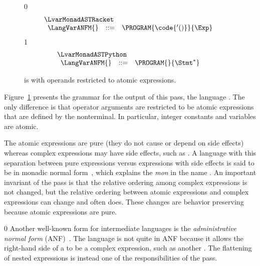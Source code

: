 \documentclass[7x10]{TimesAPriori_MIT}%
\def\racketEd{0}
\def\pythonEd{1}
\def\edition{1}
\newcommand{\pythonColor}[0]{}
\numberwithin{theorem}{chapter}
\numberwithin{definition}{chapter}
\numberwithin{equation}{chapter}
\begin{document}
\begin{figure}[tp]
\centering
\begin{tcolorbox}[colback=white]
{\if\edition\racketEd
\[
\begin{array}{l}
  \LvarMonadASTRacket \\
\begin{array}{rcl}
\LangVarANFM{}  &::=& \PROGRAM{\code{'()}}{\Exp}
\end{array}
\end{array}
\]
\fi}
{\if\edition\pythonEd\pythonColor
\[
\begin{array}{l}
  \LvarMonadASTPython \\
\begin{array}{rcl}
\LangVarANFM{}  &::=& \PROGRAM{}{\Stmt^{*}}
\end{array}
\end{array}
\]
\fi}  
\end{tcolorbox}

\caption{\LangVarANF{} is \LangVar{} with operands restricted to
  atomic expressions.}
\label{fig:Lvar-anf-syntax}
\end{figure}

Figure~\ref{fig:Lvar-anf-syntax} presents the grammar for the output
of this pass, the language \LangVarANF{}. The only difference is that
operator arguments are restricted to be atomic expressions that are
defined by the \Atm{} nonterminal. In particular, integer constants
and variables are atomic.

The atomic expressions are pure (they do not cause or depend on side
effects) whereas complex expressions may have side effects, such as
\READ{}.  A language with this separation between pure expressions
versus expressions with side effects is said to be in monadic normal
form~\citep{Moggi:1991in,Danvy:2003fk}, which explains the \textit{mon}
in the name \LangVarANF{}. An important invariant of the
 pass is that the relative ordering
among complex expressions is not changed, but the relative ordering
between atomic expressions and complex expressions can change and
often does. These changes are behavior preserving because
atomic expressions are pure.

{\if\edition\racketEd
  Another well-known form for intermediate languages is the
\emph{administrative normal form}
(ANF)~\citep{Danvy:1991fk,Flanagan:1993cg}.
 
%
The \LangVarANF{} language is not quite in ANF because it allows the
right-hand side of a  to be a complex expression, such as
another . The flattening of nested  expressions is
instead one of the responsibilities of the 
pass.
\fi}
\end{document}
